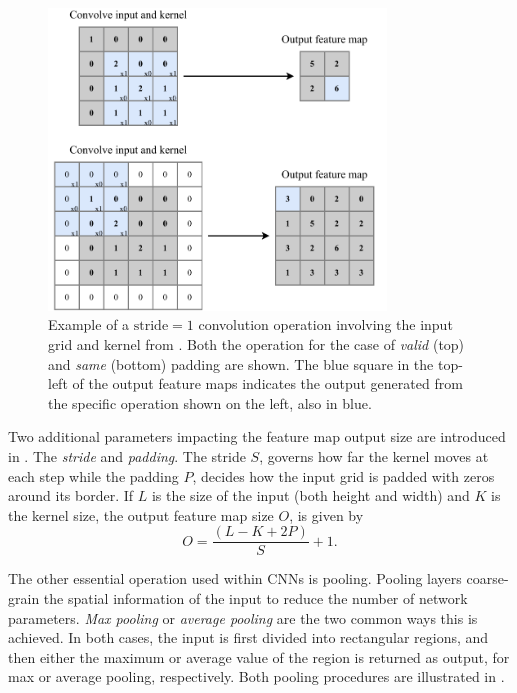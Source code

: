 \begin{figure} %
    \includegraphics[width=0.8\textwidth]{diagrams/6-cnn/conv_operation.pdf}
    \caption[Example of a convolution operation]
    {Example of a $\text{stride}=1$ convolution operation involving the input grid and kernel from
        . Both the operation for the case of \emph{valid} (top) and
        \emph{same} (bottom) padding are shown. The blue square in the top-left of the output
        feature maps indicates the output generated from the specific operation shown on the left,
        also in blue.}
    \label{fig:conv_operation}
\end{figure}

Two additional parameters impacting the feature map output size are introduced in
. The \emph{stride} and \emph{padding}. The stride $S$, governs how
far the kernel moves at each step while the padding $P$, decides how the input grid is padded with
zeros around its border. If $L$ is the size of the input (both height and width) and $K$ is the
kernel size, the output feature map size $O$, is given by
\begin{equation}
    O=\frac{(L-K+2P)}{S}+1.
    \label{eq:conv_size}
\end{equation}

The other essential operation used within CNNs is pooling. Pooling layers coarse-grain the spatial
information of the input to reduce the number of network parameters. \emph{Max pooling} or
\emph{average pooling} are the two common ways this is achieved. In both cases, the input is first
divided into rectangular regions, and then either the maximum or average value of the region is
returned as output, for max or average pooling, respectively. Both pooling procedures are
illustrated in .

